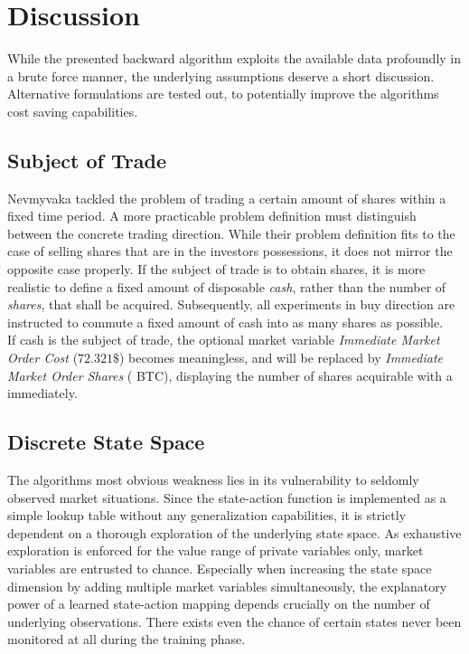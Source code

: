 \section{Discussion}
\label{chap:backwardalgorithm:discussion}
While the presented backward algorithm exploits the available data profoundly in a brute force manner, the underlying assumptions deserve a short discussion. Alternative formulations are tested out, to potentially improve the algorithms cost saving capabilities.

\subsection{Subject of Trade}
\label{chap:backwardalgorithm:discussion:subjectTrade}
Nevmyvaka \etal \cite{Nevmyvaka:2006} tackled the problem of trading a certain amount of shares within a fixed time period. A more practicable problem definition must distinguish between the concrete trading direction. While their problem definition fits to the case of selling shares that are in the investors possessions, it does not mirror the opposite case properly. If the subject of trade is to obtain shares, it is more realistic to define a fixed amount of disposable \emph{cash}, rather than the number of \emph{shares}, that shall be acquired. Subsequently, all experiments in buy direction are instructed to commute a fixed amount of cash into as many shares as possible.\\
 
If cash is the subject of trade, the optional market variable \emph{Immediate Market Order Cost}  (\eg $72.321\$$) becomes meaningless, and will be replaced by \emph{Immediate Market Order Shares} ( BTC), displaying the number of shares acquirable with a immediately.

\subsection{Discrete State Space}
The algorithms most obvious weakness lies in its vulnerability to seldomly observed market situations. Since the state-action function is implemented as a simple lookup table without any generalization capabilities, it is strictly dependent on a thorough exploration of the underlying state space. As exhaustive exploration is enforced for the value range of private variables only, market variables are entrusted to chance. Especially when increasing the state space dimension by adding multiple market variables simultaneously, the explanatory power of a learned state-action mapping depends crucially on the number of underlying observations. There exists even the chance of certain states never been monitored at all during the training phase.\\

